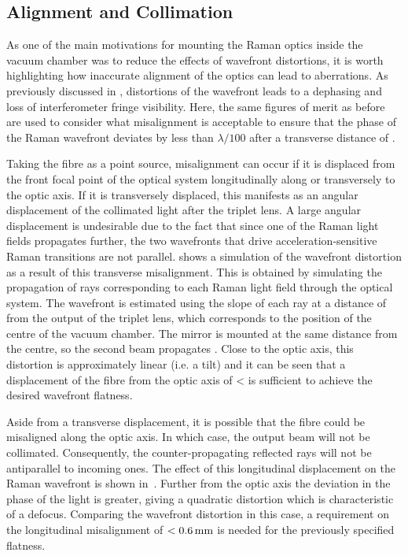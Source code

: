 \subsection{Alignment and Collimation}
As one of the main motivations for mounting the Raman optics inside the vacuum
chamber was to reduce the effects of wavefront distortions, it is worth
highlighting how inaccurate alignment of the optics can lead to aberrations. As
previously discussed in , distortions of the
wavefront leads to a dephasing and loss of interferometer fringe visibility.
Here, the same figures of merit as before are used to consider what misalignment
is acceptable to ensure that the phase of the Raman wavefront deviates by less
than \(\lambda/100\) after a transverse distance of
. \par\noindent Taking the fibre as a point source,
misalignment can occur if it is displaced from the front focal point of the
optical system longitudinally along or transversely to the optic axis. If it is
transversely displaced, this manifests as an angular displacement of the
collimated light after the triplet lens. A large angular displacement is
undesirable due to the fact that since one of the Raman light fields propagates
further, the two wavefronts that drive acceleration-sensitive Raman transitions
are not parallel.  shows a simulation of
the wavefront distortion as a result of this transverse misalignment. This is
obtained by simulating the propagation of rays corresponding to each Raman light
field through the optical system. The wavefront is estimated using the slope of
each ray at a distance of  from the output of the
triplet lens, which corresponds to the position of the centre of the vacuum
chamber. The mirror is mounted at the same distance from the centre, so the
second beam propagates . Close to the optic axis,
this distortion is approximately linear (i.e. a tilt) and it can be seen that a
displacement of the fibre from the optic axis of < is
sufficient to achieve the desired wavefront flatness. \par\noindent Aside from a
transverse displacement, it is possible that the fibre could be misaligned along
the optic axis. In which case, the output beam will not be collimated.
Consequently, the counter-propagating reflected rays will not be antiparallel to
incoming ones. The effect of this longitudinal displacement on the Raman
wavefront is shown in~. Further from the
optic axis the deviation in the phase of the light is greater, giving a
quadratic distortion which is characteristic of a defocus. Comparing the
wavefront distortion in this case, a requirement on the longitudinal
misalignment of \(< \sivalue{0.6}{\milli\metre}\) is needed for the previously
specified flatness.

